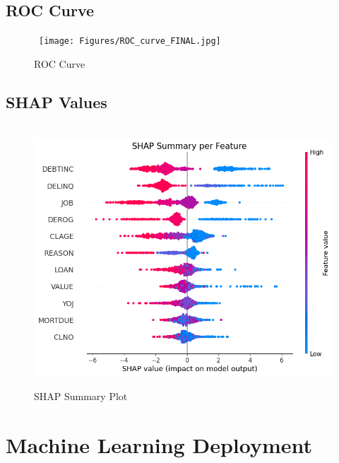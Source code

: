 \subsection{ROC Curve}

\begin{figure}[H]
    \centering
    \caption{ROC Curve}\vspace{0.5em}
    \label{fig:roc}\
    \texttt{[image: Figures/ROC\_curve\_FINAL.jpg]}
    \vspace{-1em}
\end{figure}

\subsection{SHAP Values}

\begin{figure}[H]
    \centering
    \caption{SHAP Summary Plot}\vspace{0.5em}
    \label{fig:shap}\
    \includegraphics[width=140mm]{Figures/SHAP_values.jpg}
    \vspace{-1em}
\end{figure}

\section{Machine Learning Deployment}
